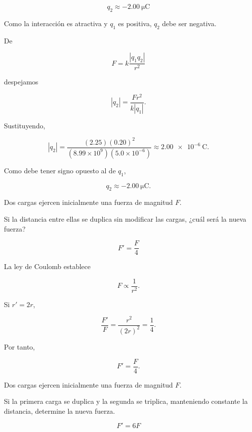 \begin{respuesta}
\[
\boxed{q_2\approx-\SI{2.00}{\micro\coulomb}}
\]
\end{respuesta}

\begin{explicacion}
Como la interacción es atractiva y \(q_1\) es positiva, \(q_2\) debe ser
negativa.

De

\[
F=k\frac{|q_1q_2|}{r^2}
\]

despejamos

\[
|q_2|=\frac{Fr^2}{k|q_1|}.
\]

Sustituyendo,

\[
|q_2|=
\frac{(2.25)(0.20)^2}
{(8.99\times10^9)(5.0\times10^{-6})}
\approx\SI{2.00e-6}{\coulomb}.
\]

Como debe tener signo opuesto al de \(q_1\),

\[
\boxed{q_2\approx-\SI{2.00}{\micro\coulomb}}.
\]
\end{explicacion}


\begin{ejercicio}
Dos cargas ejercen inicialmente una fuerza de magnitud \(F\).

Si la distancia entre ellas se duplica sin modificar las cargas, ¿cuál será
la nueva fuerza?
\end{ejercicio}

\begin{respuesta}
\[
\boxed{F'=\frac{F}{4}}
\]
\end{respuesta}

\begin{explicacion}
La ley de Coulomb establece

\[
F\propto\frac{1}{r^2}.
\]

Si \(r'=2r\),

\[
\frac{F'}{F}=\frac{r^2}{(2r)^2}=\frac14.
\]

Por tanto,

\[
\boxed{F'=\frac{F}{4}}.
\]
\end{explicacion}


\begin{ejercicio}
Dos cargas ejercen inicialmente una fuerza de magnitud \(F\).

Si la primera carga se duplica y la segunda se triplica, manteniendo
constante la distancia, determine la nueva fuerza.
\end{ejercicio}

\begin{respuesta}
\[
\boxed{F'=6F}
\]
\end{respuesta}

